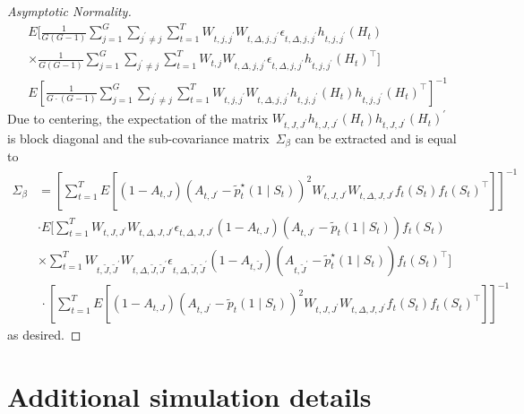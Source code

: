 \documentclass[supplementary, lineno]{biometrika}
\begin{document}
\begin{proof}[Asymptotic Normality]
\begin{align*}
                &E \bigg[ \frac{1}{G (G-1)} \sum_{j=1}^G \sum_{j^\prime \neq j} \sum_{t=1}^T W_{t,j, j^\prime} W_{t,\Delta,j,j^\prime} \epsilon_{t, \Delta,j, j^\prime} h_{t,j, j^\prime}(H_t) \\
            &\times  \frac{1}{G(G-1)} \sum_{j=1}^G \sum_{j^\prime \neq j} \sum_{t=1}^T W_{t,j} W_{t,\Delta,j,j^\prime}
                  \epsilon_{t,\Delta, j, j^\prime} h_{t,j, j^\prime}(H_t)^\top \bigg] \\
                &E \left[ \frac{1}{G \cdot (G-1)} \sum_{j=1}^G \sum_{j^\prime \neq j} \sum_{t=1}^T W_{t,j,j^\prime} W_{t,\Delta,j,j^\prime} h_{t,j,j^\prime}(H_t)
  h_{t,j,j^\prime}(H_t)^\top  \right]^{-1}
\end{align*}
Due to centering, the expectation of the matrix
$W_{t,J, J^\prime} h_{t,J,J^\prime}(H_t) h_{t,J, J^\prime} (H_t)^\prime$ is block diagonal and
the sub-covariance matrix~$\Sigma_{\beta}$ can be extracted and is equal to
\begin{align*}
 \Sigma_{\beta} &=  \left[ \sum_{t=1}^T E[ (1- A_{t,J}) (A_{t,J^\prime} - \tilde{p}_t^\star (1 \mid S_t)
                  )^2 W_{t,J, J^\prime} W_{t,\Delta, J, J^\prime} f_t (S_t) f_t (S_t)^\top ] \right]^{-1} \\
  &\cdot E \bigg[ \sum_{t=1}^T W_{t,J, J^\prime} W_{t,\Delta, J, J^\prime} \epsilon_{t, \Delta, J, J^\prime}
                  (1-A_{t,J}) (A_{t,J^\prime} - \tilde{p}_t( 1 \mid S_t)) f_t(S_t) \\
          &\times  \sum_{t=1}^T W_{t,\tilde  J, \tilde J^\prime} W_{t,\Delta, \tilde J, \tilde J^\prime} \epsilon_{t, \Delta,  \tilde J, \tilde J^\prime}
                  (1-A_{t,\tilde J}) (A_{t,\tilde J^\prime} - \tilde{p}_t^\star( 1 \mid S_t)) f_t(S_t)^\top
                  \bigg] \\
 &\, \cdot \left[ \sum_{t=1}^T E[ (1-A_{t,J}) (A_{t,J^\prime} - \tilde{p}_t (1 \mid S_t)
                  )^2 W_{t,J,J^\prime} W_{t,\Delta, J, J^\prime} f_t (S_t) f_t (S_t)^\top ] \right]^{-1}
\end{align*}
as desired.
\end{proof}

\newpage

\section{Additional simulation details}
\label{app:simdetails}

\end{document}

